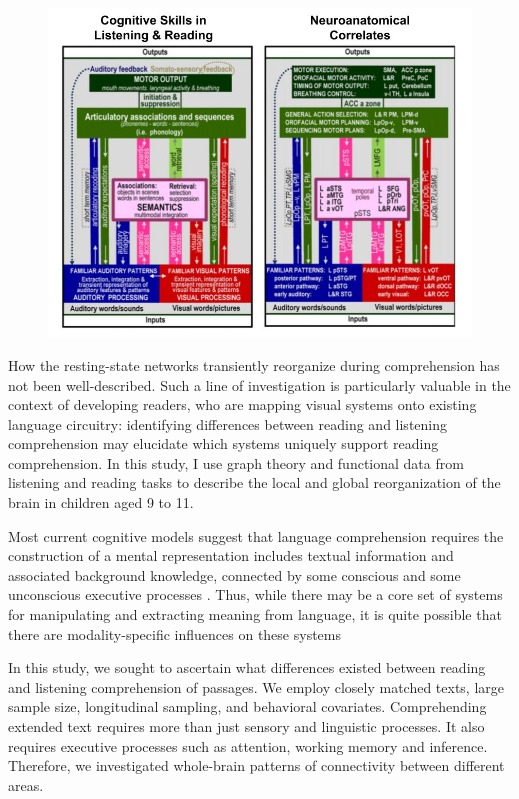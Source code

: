 \begin{figure}[tp]
	\centering
	\includegraphics[width=5in]{images/ch2-price-language-models.jpg}
	\caption[Schematics of skills and brain areas used in reading.]
	\label{fig:ch2-price-language-models}
\end{figure}

How the resting-state networks transiently reorganize during comprehension has not been well-described. Such a line of investigation is particularly valuable in the context of developing readers, who are mapping visual systems onto existing language circuitry: identifying differences between reading and listening comprehension may elucidate which systems uniquely support reading comprehension. In this study, I use graph theory and functional data from listening and reading tasks to describe the local and global reorganization of the brain in children aged 9 to 11.

Most current cognitive models suggest that language comprehension requires the construction of a mental representation includes textual information and associated background knowledge, connected by some conscious and some unconscious executive processes \cite{Kendou2014}. Thus, while there may be a core set of systems for manipulating and extracting meaning from language, it is quite possible that there are modality-specific influences on these systems 

In this study, we sought to ascertain what differences existed between reading and listening comprehension of passages. We employ closely matched texts, large sample size, longitudinal sampling, and behavioral covariates. Comprehending extended text requires more than just sensory and linguistic processes. It also requires executive processes such as attention, working memory and inference. Therefore, we investigated whole-brain patterns of connectivity between different areas. 

